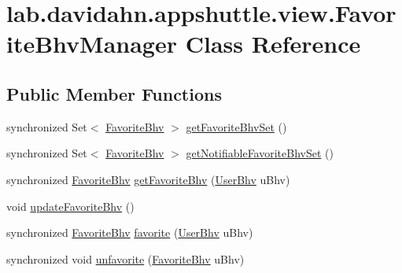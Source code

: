 \hypertarget{classlab_1_1davidahn_1_1appshuttle_1_1view_1_1_favorite_bhv_manager}{\section{lab.\-davidahn.\-appshuttle.\-view.\-Favorite\-Bhv\-Manager \-Class \-Reference}
\label{classlab_1_1davidahn_1_1appshuttle_1_1view_1_1_favorite_bhv_manager}
}
\subsection*{\-Public \-Member \-Functions}
\begin{DoxyCompactItemize}
\item 
synchronized \-Set$<$ \hyperlink{classlab_1_1davidahn_1_1appshuttle_1_1view_1_1_favorite_bhv}{\-Favorite\-Bhv} $>$ \hyperlink{classlab_1_1davidahn_1_1appshuttle_1_1view_1_1_favorite_bhv_manager_ab20144f0da1fe5a22731ac49d6c5c05a}{get\-Favorite\-Bhv\-Set} ()
\item 
synchronized \-Set$<$ \hyperlink{classlab_1_1davidahn_1_1appshuttle_1_1view_1_1_favorite_bhv}{\-Favorite\-Bhv} $>$ \hyperlink{classlab_1_1davidahn_1_1appshuttle_1_1view_1_1_favorite_bhv_manager_a4d0bdf7148c80391d67ed9c84ec371d6}{get\-Notifiable\-Favorite\-Bhv\-Set} ()
\item 
synchronized \hyperlink{classlab_1_1davidahn_1_1appshuttle_1_1view_1_1_favorite_bhv}{\-Favorite\-Bhv} \hyperlink{classlab_1_1davidahn_1_1appshuttle_1_1view_1_1_favorite_bhv_manager_a819c380076b4135b595f57cf2c6ba87b}{get\-Favorite\-Bhv} (\hyperlink{interfacelab_1_1davidahn_1_1appshuttle_1_1collect_1_1bhv_1_1_user_bhv}{\-User\-Bhv} u\-Bhv)
\item 
void \hyperlink{classlab_1_1davidahn_1_1appshuttle_1_1view_1_1_favorite_bhv_manager_a512ba14af7e6330d226a026384514a8b}{update\-Favorite\-Bhv} ()
\item 
synchronized \hyperlink{classlab_1_1davidahn_1_1appshuttle_1_1view_1_1_favorite_bhv}{\-Favorite\-Bhv} \hyperlink{classlab_1_1davidahn_1_1appshuttle_1_1view_1_1_favorite_bhv_manager_a128f59ad36072e3bc9e29ec93eaf1c22}{favorite} (\hyperlink{interfacelab_1_1davidahn_1_1appshuttle_1_1collect_1_1bhv_1_1_user_bhv}{\-User\-Bhv} u\-Bhv)
\item 
synchronized void \hyperlink{classlab_1_1davidahn_1_1appshuttle_1_1view_1_1_favorite_bhv_manager_ab96c55c88295ee1c071a8c04ba8d5931}{unfavorite} (\hyperlink{classlab_1_1davidahn_1_1appshuttle_1_1view_1_1_favorite_bhv}{\-Favorite\-Bhv} u\-Bhv)

\end{DoxyCompactItemize}
